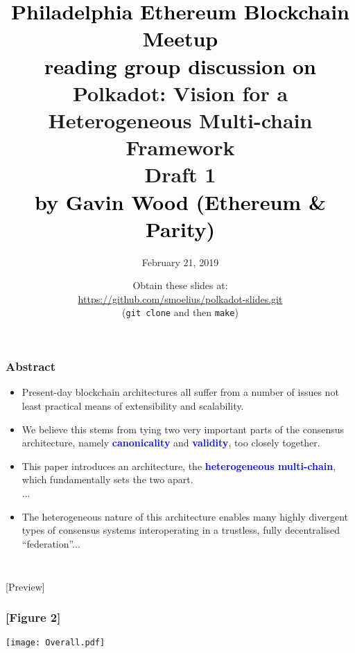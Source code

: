 \documentclass[t,usepdftitle=false]{beamer}
\title{\textcolor{black}{Philadelphia Ethereum Blockchain Meetup} \\
\textcolor{black}{reading group discussion on} \\
Polkadot: Vision for a Heterogeneous Multi-chain Framework \\ {\smaller \textbf{Draft 1}} \\
\textcolor{black}{by Gavin Wood (Ethereum \& Parity)}}
\author{February 21, 2019}
\date{Obtain these slides at: \\
\url{https://github.com/smoelius/polkadot-slides.git} \\
(\texttt{git clone} and then \texttt{make})}
\newenvironment{Figure}
  {\par\medskip\noindent\minipage{\linewidth}}
  {\endminipage\par\medskip}
\renewcommand{\textit}[1]{\textcolor{blue}{\textbf{#1}}}
\begin{document}
\maketitle

\begin{frame}
\frametitle{Abstract}
\begin{itemize}
\item
Present-day blockchain architectures all suffer from a number of issues not least practical means of extensibility and scalability.
\item We believe this stems from tying two very important parts of the consensus architecture, namely \textit{canonicality} and \textit{validity}, too closely together.
\item This paper introduces an architecture, the \textit{heterogeneous multi-chain}, which fundamentally sets the two apart.\\
...
\item
 The heterogeneous nature of this architecture enables many highly divergent types of consensus systems interoperating in a trustless, fully decentralised ``federation''...
\end{itemize}
\end{frame}

\begin{frame}
\frametitle{\phantom{}}
\vfill
\centering
\LARGE
\mbox{}\\
{[}Preview{]}
\vfill
\end{frame}

\begin{frame}
\frametitle{[Figure 2]}
\begin{Figure}
\centering
\vspace{-\baselineskip}
\texttt{[image: Overall.pdf]}
\end{Figure}
\end{frame}
\end{document}
